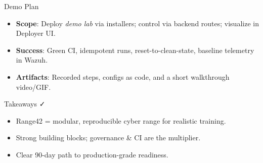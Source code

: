 \documentclass[aspectratio=169]{beamer}
\begin{document}
\begin{frame}{Demo Plan \; \faPlay}
  \begin{itemize}
    \item \textbf{Scope}: Deploy \emph{demo lab} via installers; control via backend routes; visualize in Deployer UI.
    \item \textbf{Success}: Green CI, idempotent runs, reset-to-clean-state, baseline telemetry in Wazuh.
    \item \textbf{Artifacts}: Recorded steps, configs as code, and a short walkthrough video/GIF.
  \end{itemize}
\end{frame}

\begin{frame}{Takeaways \; \faCheck}
  \begin{itemize}
    \item Range42 = modular, reproducible cyber range for realistic training.
    \item Strong building blocks; \alert{governance \& CI} are the multiplier.
    \item Clear 90-day path to production-grade readiness.
  \end{itemize}
\end{frame}
\end{document}
